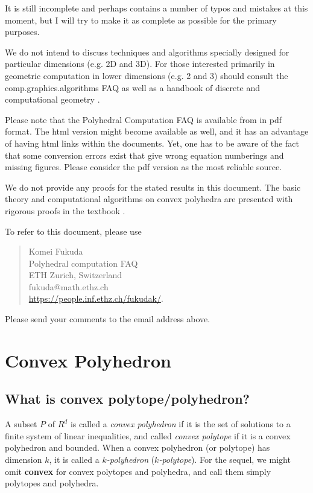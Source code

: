 \documentclass[a4paper,12pt]{article}
\begin{document}
It is still incomplete and perhaps contains a number of
typos and mistakes at this moment, but I will try to
make it as complete as possible for the primary purposes.

We do not intend to discuss techniques and algorithms
specially designed for particular dimensions (e.g. 2D and 3D).
For those interested primarily in geometric computation in
lower dimensions (e.g. 2 and 3) should consult the
 comp.graphics.algorithms {FAQ}
 \cite{o-cgafaq} as well as a handbook of discrete and 
computational geometry \cite{go-hbdcg-97}.

Please note that the Polyhedral Computation FAQ is available from 
\cite{f-kfhome} in pdf format. The html version might become
available as well, and it has an advantage of having
html links within the documents.  Yet, one has to be aware of
the fact that some conversion errors exist that give 
wrong equation numberings and
missing figures.  Please consider the pdf version as the most reliable source.

We do not provide any proofs for the stated results in this document.
 The basic theory and computational algorithms on convex polyhedra are presented
with rigorous proofs in the textbook \cite{f-pc-20}.

To refer to this document, please use
\begin{quote}
Komei Fukuda\\
Polyhedral computation {FAQ}\\
 ETH Zurich, Switzerland\\
    fukuda@math.ethz.ch\\
\url{https://people.inf.ethz.ch/fukudak/}.
\end{quote}
Please send your comments to the email address above.
\section{Convex Polyhedron}  \label{Sec:polytope}
\subsection{What is convex polytope/polyhedron?} \label{polytope:polytope}

A subset $P$ of $R^d$ is called a {\em convex polyhedron\/} if it is
the set of solutions to a finite system of linear inequalities, and 
called {\em convex polytope\/} if it is a convex polyhedron and bounded.
When a convex polyhedron (or polytope) has dimension $k$, it is
called a {\em $k$-polyhedron\/} ({\em $k$-polytope\/}).
For the sequel, we might omit  {\bf convex} for convex polytopes
and polyhedra, and call them simply polytopes and polyhedra.
\end{document}
